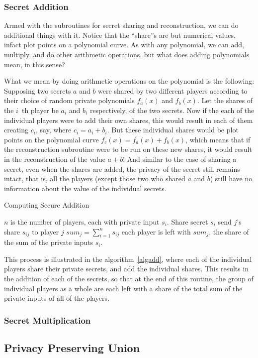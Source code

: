 \subsubsection{Secret Addition}
\label{sec:add-prim}
Armed with the subroutines for secret sharing and reconstruction, we can
do additional things with it. Notice that the ``share''s are but 
numerical values, infact plot points on a polynomial curve. As with any 
polynomial, we can add, multiply, and do other arithmetic operations, but
what does adding polynomials mean, in this sense?

What we mean by doing arithmetic operations on the polynomial is the 
following:
Supposing two secrets $a$ and $b$ were shared by two different players
according to their choice of random private polynomials $f_{a}(x)$ and
$f_{b}(x)$. Let the shares of the $i$~th player be $a_i$ and $b_i$
respectively, of the two secrets. Now if the each of the individual players 
were to add their own shares, this would result in each of them creating
$c_i$, say, where $c_i = a_i + b_i$. But these individual shares 
would be plot points on the polynomial curve 
$f_{c}(x) = f_{a}(x) + f_{b}(x)$, which means that if the reconstruction
subroutine were to be run on these new shares, it would result in the 
reconstruction of the value $a+b$! And similar to the case of sharing 
a secret, even when the shares are added, the privacy of the secret still
remains intact, that is, all the players (except those two who shared $a$
and $b$) still have no information about the value of the individual secrets.

\begin{algorithm}
\caption{Computing Secure Addition}
\label{algadd}
\begin{algorithmic}
\REQUIRE $n$ is the number of players, each with private input $s_{i}$.
\STATE {}
	\STATE Share secret $s_{i}$
		\STATE send $j$'s share $s_{ij}$ to player $j$
	\ENDFOR
\ENDFOR
{}
	\STATE $sum_{j} = \sum_{i=1}^{n}s_{ij} $
\ENDFOR
\ENSURE each player is left with $sum_j$, the share of the sum of the private
inputs $s_{i}$.
\end{algorithmic}
\end{algorithm}

This process is illustrated in the algorithm~\ref{algadd}, where each of the
individual players share their private secrets, and add the individual shares.
This results in the addition of each of the secrets, so that at the end of this
routine, the group of individual players as a whole are each left with a share of
the total sum of the private inputs of all of the players.

\subsubsection{Secret Multiplication}
\label{sec:mult-prim}

\subsection{Privacy Preserving Union}
\label{sec:union-prim}
